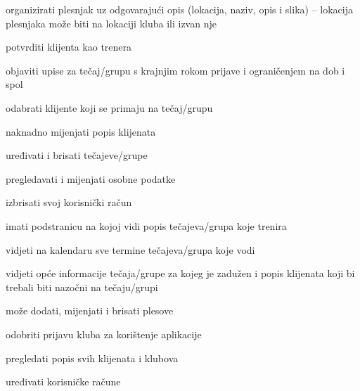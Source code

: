 \begin{packed_enum}
			
				\item  {}
				
				\begin{packed_enum}
					\item organizirati plesnjak uz odgovarajući opis (lokacija, naziv, opis i slika) – lokacija plesnjaka može biti na lokaciji kluba ili izvan nje 
					\item potvrditi klijenta kao trenera
					\item objaviti upise za tečaj/grupu s krajnjim rokom prijave i ograničenjem na dob i spol
					\item odabrati klijente koji se primaju na tečaj/grupu 
					\item naknadno mijenjati popis klijenata
					\item uređivati i brisati tečajeve/grupe
					\item pregledavati i mijenjati osobne podatke
					\item izbrisati svoj korisnički račun 

				\end{packed_enum}
			

			
				\item  {}
				
				\begin{packed_enum}
					
					\item imati podstranicu na kojoj vidi popis tečajeva/grupa koje trenira
					\item vidjeti na kalendaru sve termine tečajeva/grupa koje vodi
					\item vidjeti opće informacije tečaja/grupe za kojeg je zadužen i popis klijenata koji bi trebali biti nazočni na tečaju/grupi

				\end{packed_enum}
			

			
				\item  {}
				
				\begin{packed_enum}
					
					\item može dodati, mijenjati i brisati plesove
					\item  odobriti prijavu kluba za korištenje aplikacije 
					\item pregledati popis svih klijenata i klubova
					\item uređivati korisničke račune


\end{packed_enum}
\end{packed_enum}
